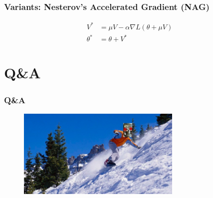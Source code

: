 \documentclass{beamer}
\begin{document}
\begin{frame}
  \frametitle{Variants: Nesterov's Accelerated Gradient (NAG)}
  \begin{align*}
    V^{*}&=\mu V-\alpha\nabla L(\theta+\mu V) \\
    \theta^{*}&=\theta+V^{*}
  \end{align*}
\end{frame}

\section*{Q\&A}

\begin{frame}
  \frametitle{Q\&A}
  \begin{figure}
    \centering
    \includegraphics[width=0.7\textwidth]{gradient_descent.jpg}
  \end{figure}
\end{frame}
\end{document}
